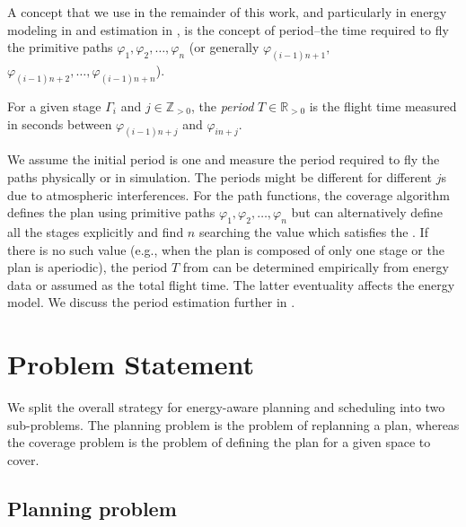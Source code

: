 A concept that we use in the remainder of this work, and particularly in energy modeling in  and estimation in , is the concept of period--the time required to fly the primitive paths $\varphi_1,\varphi_2,\dots,\varphi_n$ (or generally $\varphi_{(i-1)n+1},$ $\varphi_{(i-1)n+2},\dots,\varphi_{(i-1)n+n}$). 

\begin{defn}[Period]
  \label{def:period}
  For a given stage $\Gamma_i$ and $j\in\mathbb{Z}_{>0}$, the \emph{period} $T\in\mathbb{R}_{> 0}$ is the flight time measured in seconds between $\varphi_{(i-1)n+j}$ and $\varphi_{in+j}$.
\end{defn} 
  
We assume the initial period is one and measure the period required to fly the paths physically or in simulation. The periods might be different for different $j$s due to atmospheric interferences. For the path functions, the coverage algorithm defines the plan using primitive paths $\varphi_1,\varphi_2,\dots,\varphi_n$ but can alternatively define all the stages explicitly and find $n$ searching the value which satisfies the . If there is no such value (e.g., when the plan is composed of only one stage or the plan is aperiodic), the period $T$ from  can be determined empirically from energy data or assumed as the total flight time. The latter eventuality affects the energy model. We discuss the period estimation further in .


\section{Problem Statement}

We split the overall strategy for energy-aware planning and scheduling into two sub-problems. The planning problem is the problem of replanning a plan, whereas the coverage problem is the problem of defining the plan for a given space to cover.  

\subsection{Planning problem}
\label{sec:plan-pb}

